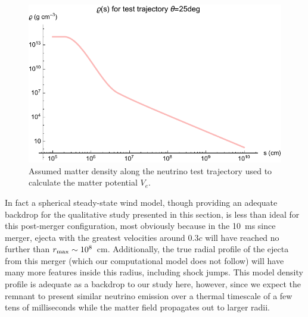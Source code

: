 \documentclass[aps,floatfix,prd,superscriptaddress,twocolumn]{revtex4-1}
\begin{document}
\begin{figure}
  \includegraphics[width=\columnwidth]{profile-density-000Mo-025deg}
  \caption{Assumed matter density along the neutrino test trajectory
    used to calculate the matter potential $V_e$.
    }
  \label{fig:test_traj_density}
\end{figure}

In fact a spherical steady-state wind model, though providing an adequate
backdrop for the qualitative study presented in this section,
is less than ideal for this post-merger configuration,
most obviously because in the 10~ms since merger,
ejecta with the greatest velocities around $0.3c$
will have reached no further than $r_{\rm max} \sim 10^8$~cm.
Additionally, the true radial profile of the ejecta from this merger
(which our computational model does not follow)
will have many more features inside this radius, including shock jumps.
This model density profile is adequate as a backdrop to our study here, however,
since we expect the remnant to present similar neutrino emission over a thermal
timescale of a few tens of milliseconds
while the matter field propagates out to larger radii.
\end{document}
